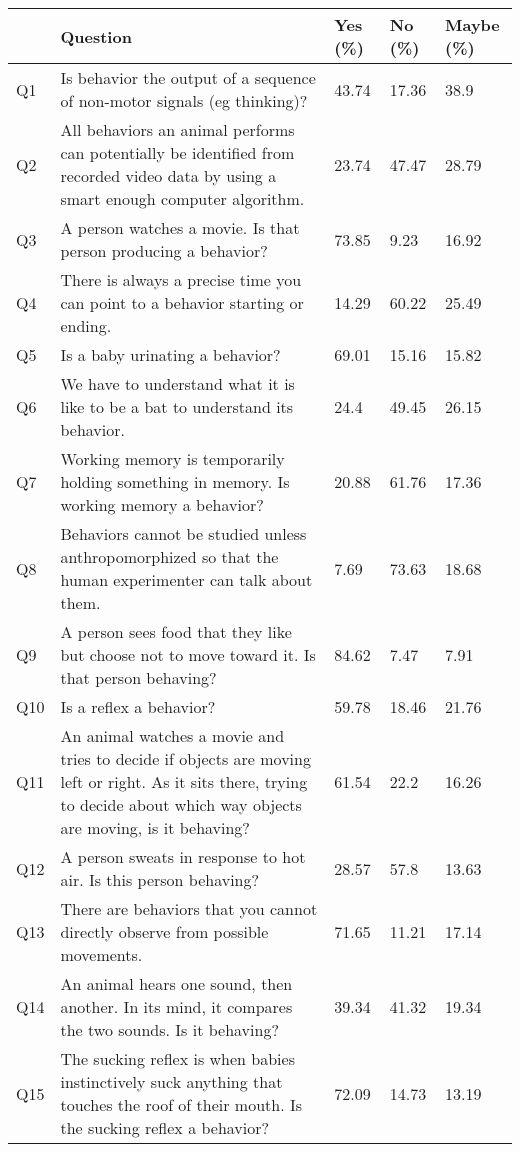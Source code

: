 \begin{longtable}{p{1cm} p{12cm} || p{1cm} p{1cm} p{1cm}}
 & Question & Yes (\%) & No (\%) & Maybe (\%) \\ 
\hline
Q1 & Is behavior the output of a sequence of non-motor signals (eg thinking)? & 43.74 & 17.36 & 38.9 \\ 
Q2 & All behaviors an animal performs can potentially be identified from recorded video data by using a smart enough computer algorithm. & 23.74 & 47.47 & 28.79 \\ 
Q3 & A person watches a movie. Is that person producing a behavior? & 73.85 & 9.23 & 16.92 \\ 
Q4 & There is always a precise time you can point to a behavior starting or ending. & 14.29 & 60.22 & 25.49 \\ 
Q5 & Is a baby urinating a behavior? & 69.01 & 15.16 & 15.82 \\ 
Q6 & We have to understand what it is like to be a bat to understand its behavior. & 24.4 & 49.45 & 26.15 \\ 
Q7 & Working memory is temporarily holding something in memory. Is working memory a behavior? & 20.88 & 61.76 & 17.36 \\ 
Q8 & Behaviors cannot be studied unless anthropomorphized so that the human experimenter can talk about them. & 7.69 & 73.63 & 18.68 \\ 
Q9 & A person sees food that they like but choose not to move toward it. Is that person behaving? & 84.62 & 7.47 & 7.91 \\ 
Q10 & Is a reflex a behavior? & 59.78 & 18.46 & 21.76 \\ 
Q11 & An animal watches a movie and tries to decide if objects are moving left or right. As it sits there, trying to decide about which way objects are moving, is it behaving? & 61.54 & 22.2 & 16.26 \\ 
Q12 & A person sweats in response to hot air. Is this person behaving? & 28.57 & 57.8 & 13.63 \\ 
Q13 & There are behaviors that you cannot directly observe from possible movements. & 71.65 & 11.21 & 17.14 \\ 
Q14 & An animal hears one sound, then another. In its mind, it compares the two sounds. Is it behaving? & 39.34 & 41.32 & 19.34 \\ 
Q15 & The sucking reflex is when babies instinctively suck anything that touches the roof of their mouth. Is the sucking reflex a behavior? & 72.09 & 14.73 & 13.19 \\ 

\end{longtable}
